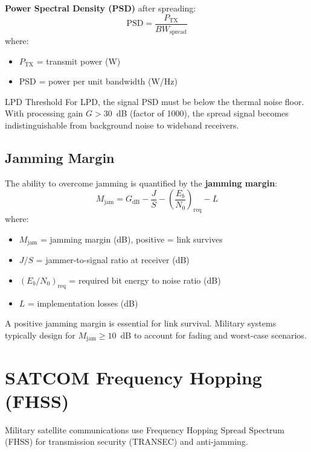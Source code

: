 \textbf{Power Spectral Density (PSD)} after spreading:
\begin{equation}
\text{PSD} = \frac{P_{\text{TX}}}{BW_{\text{spread}}}
\end{equation}
where:
\begin{itemize}
\item $P_{\text{TX}}$ = transmit power (W)
\item PSD = power per unit bandwidth (W/Hz)
\end{itemize}

\begin{calloutbox}{LPD Threshold}
For LPD, the signal PSD must be below the thermal noise floor. With processing gain $G > 30$~dB (factor of 1000), the spread signal becomes indistinguishable from background noise to wideband receivers.
\end{calloutbox}

\subsection{Jamming Margin}

The ability to overcome jamming is quantified by the \textbf{jamming margin}:
\begin{equation}
M_{\text{jam}} = G_{\text{dB}} - \frac{J}{S} - \left(\frac{E_b}{N_0}\right)_{\text{req}} - L
\end{equation}
where:
\begin{itemize}
\item $M_{\text{jam}}$ = jamming margin (dB), positive = link survives
\item $J/S$ = jammer-to-signal ratio at receiver (dB)
\item $(E_b/N_0)_{\text{req}}$ = required bit energy to noise ratio (dB)
\item $L$ = implementation losses (dB)
\end{itemize}

\begin{warningbox}
A positive jamming margin is essential for link survival. Military systems typically design for $M_{\text{jam}} \geq 10$~dB to account for fading and worst-case scenarios.
\end{warningbox}

\section{SATCOM Frequency Hopping (FHSS)}

Military satellite communications use Frequency Hopping Spread Spectrum (FHSS) for transmission security (TRANSEC) and anti-jamming.

